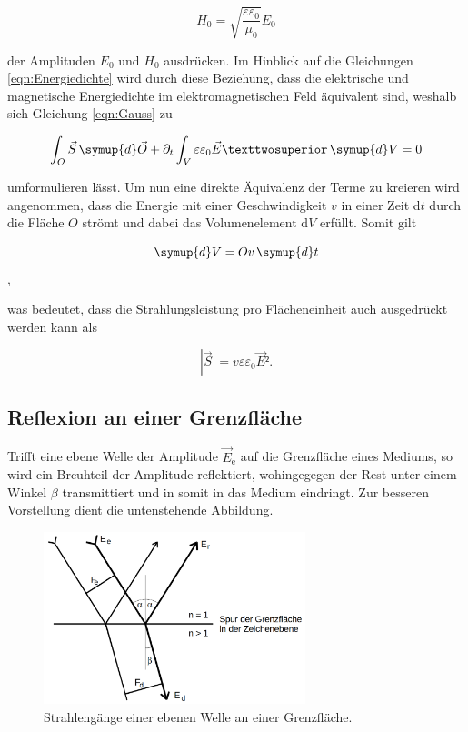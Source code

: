 \begin{equation}
    H_0 = \sqrt{\frac{\varepsilon\varepsilon_0}{\mu_0}}E_0
\label{eqn:Amplituden}
\end{equation}

\noindent der Amplituden $E_0$ und $H_0$ ausdrücken. Im Hinblick auf die Gleichungen \eqref{eqn:Energiedichte} wird durch diese Beziehung, dass die elektrische und magnetische 
Energiedichte im elektromagnetischen Feld äquivalent sind, weshalb sich Gleichung \eqref{eqn:Gauss} zu

\begin{equation*}
    \int_O \vec{S}\,\symup{d}\vec{O} +\partial_t\int_V \varepsilon\varepsilon_0\vec{E}²\,\symup{d}V = 0
\end{equation*}

\noindent umformulieren lässt. Um nun eine direkte Äquivalenz der Terme zu kreieren wird angenommen, dass die Energie mit einer Geschwindigkeit $v$ in einer Zeit d$t$ 
durch die Fläche $O$ strömt und dabei das Volumenelement d$V$ erfüllt. Somit gilt

\begin{equation*}
    \symup{d}V = Ov\,\symup{d}t 
\end{equation*},

\noindent was bedeutet, dass die Strahlungsleistung pro Flächeneinheit auch ausgedrückt werden kann als 

\begin{equation}
    |\vec{S}| = v\varepsilon\varepsilon_0\vec{E}².
\label{eqn:BetragS}
\end{equation}

\subsection{Reflexion an einer Grenzfläche}
\label{sec:Grenzflaeche}

Trifft eine ebene Welle der Amplitude $\vec{E}_\text{e}$ auf die Grenzfläche eines Mediums, so wird ein Brcuhteil der Amplitude reflektiert, wohingegegen der Rest unter einem 
Winkel $\beta$ transmittiert und in somit in das Medium eindringt. Zur besseren Vorstellung dient die untenstehende Abbildung.

\begin{figure}[H]
    \centering
    \includegraphics[height=5cm]{Grenzflaeche.png}
    \caption{Strahlengänge einer ebenen Welle an einer Grenzfläche\cite{Versuchsanleitung_v407}.}
    \label{fig:SkizzeGrenzflaeche}
\end{figure}

